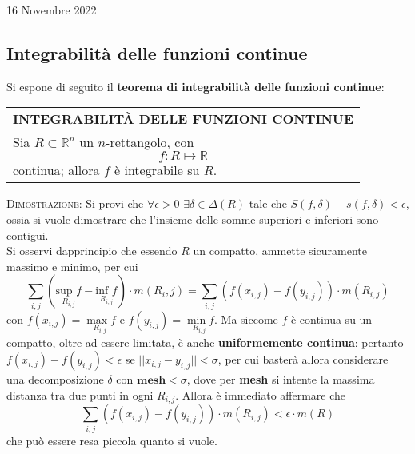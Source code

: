 \documentclass[a4paper]{extarticle}
\renewcommand\arraystretch{}
\begin{document}
\newpage
\noindent
\begin{center}
    16 Novembre 2022
\end{center}
\subsection{Integrabilità delle funzioni continue}
Si espone di seguito il \textbf{teorema di integrabilità delle funzioni continue}:

\vspace{1em}
\setlength{\tabcolsep}{14pt}
\renewcommand{\arraystretch}{2}
\noindent
\begin{tabularx}{\textwidth}{@{}|P|@{}}
    \hline
    {\textbf{INTEGRABILITÀ DELLE FUNZIONI CONTINUE}}\\
    \parbox{\linewidth}{Sia $R \subset \mathbb{R}^n$ un $n$-rettangolo, con
    \[f : R \longmapsto \mathbb{R}\]
    continua; allora $f$ è integrabile su $R$.\vspace{3mm}}\\
    \hline
\end{tabularx}

\vspace{2em}
\noindent
\normalfont \normalsize
\textsc{Dimostrazione}: Si provi che $\forall \epsilon >0$ $\exists \delta \in \Delta(R)$ tale che $S(f,\delta)-s(f,\delta) < \epsilon$, ossia si vuole dimostrare che l'insieme delle somme superiori e inferiori sono contigui.\\
Si osservi dapprincipio che essendo $R$ un compatto, ammette sicuramente massimo e minimo, per cui
\[\sum_{i,j} \left(\underset{R_{i,j}}{\text{sup } f} - \underset{R_{i,j}}{\text{inf } f}\right) \cdot m(R_i,j) = \sum_{i,j} (f(x_{i,j}) - f(y_{i,j})) \cdot m(R_{i,j})\]
con $f(x_{i,j}) = \underset{R_{i,j}}{\max f}$ e $f(y_{i,j}) = \underset{R_{i,j}}{\min f}$. Ma siccome $f$ è continua su un compatto, oltre ad essere limitata, è anche \textbf{uniformemente continua}: pertanto $f(x_{i,j}) - f(y_{i,j}) < \epsilon$ se $\vert \vert x_{i,j} - y_{i,j} \vert \vert < \sigma$, per cui basterà allora considerare una decomposizione $\delta$ con $\textbf{mesh} < \sigma$, dove per \textbf{mesh} si intente la massima distanza tra due punti in ogni $R_{i,j}$. Allora è immediato affermare che 
\[\sum_{i,j} (f(x_{i,j}) - f(y_{i,j})) \cdot m(R_{i,j}) < \epsilon \cdot m(R)\]
che può essere resa piccola quanto si vuole.

\vspace{1em}
\noindent
\end{document}
